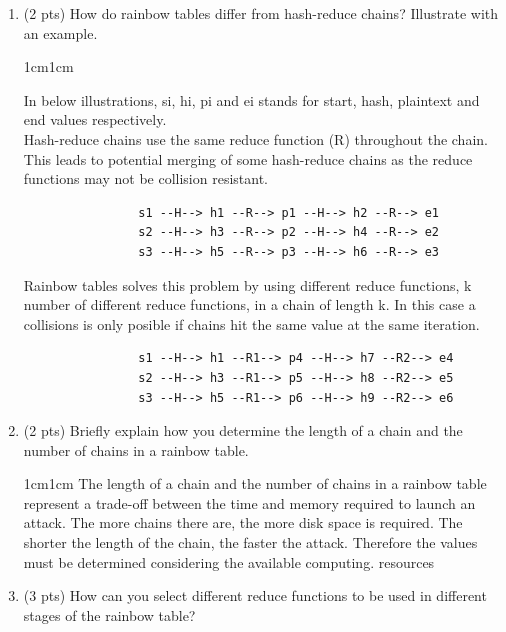 \documentclass[11pt,letterpaper]{article}
\newenvironment{answer}{\em \color{blue} \begin{adjustwidth}{1cm}{1cm}}{\end{adjustwidth}}
\begin{document}
	\begin{enumerate}
		
		\item (2 pts) How do rainbow tables differ from hash-reduce chains? Illustrate with an example.
		
		\begin{answer}
			
			In below illustrations, si, hi, pi and ei stands for start, hash, plaintext and end values respectively.\\
			
			Hash-reduce chains use the same reduce function (R) throughout the chain. This leads to potential merging of some hash-reduce chains as the reduce functions may not be collision resistant. 
			
			\begin{verbatim}
				s1 --H--> h1 --R--> p1 --H--> h2 --R--> e1
				s2 --H--> h3 --R--> p2 --H--> h4 --R--> e2
				s3 --H--> h5 --R--> p3 --H--> h6 --R--> e3				
			\end{verbatim}
			
			Rainbow tables solves this problem by using different reduce functions, k number of different reduce functions, in a chain of length k. In this case a collisions is only posible if chains hit the same value at the same iteration.  
			
			\begin{verbatim}
				s1 --H--> h1 --R1--> p4 --H--> h7 --R2--> e4
				s2 --H--> h3 --R1--> p5 --H--> h8 --R2--> e5
				s3 --H--> h5 --R1--> p6 --H--> h9 --R2--> e6								
			\end{verbatim}
			
		\end{answer}
		
		\item (2 pts) Briefly explain how you determine the length of a chain and the number of chains in a rainbow table. 
		
		\begin{answer}
		The length of a chain and the number of chains in a rainbow table represent a trade-off between the time and memory required to launch an attack. The more chains there are, the more disk space is required. The shorter the length of the chain, the faster the attack.	Therefore the values must be determined considering the available computing. resources 
		\end{answer}
		
		\item (3 pts) How can you select different reduce functions to be used in different stages of the rainbow table?
		

\end{enumerate}
\end{document}
